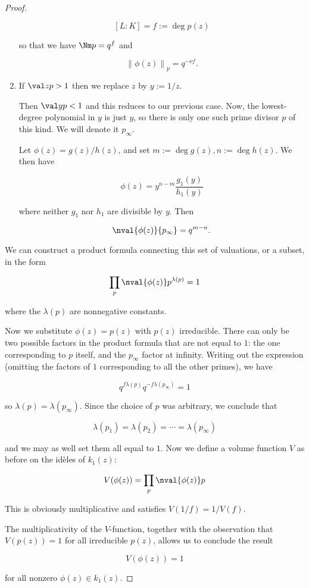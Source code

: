\begin{proof}
\begin{enumerate}
    \[ [L:K] = f := \deg p(z) \]

    so that we have $\Nm p = q^f$ and

    \[ {\left\lVert \phi(z) \right\rVert}_p = q^{-\nu f}. \]

  \item If $\val z p > 1$ then we replace $z$ by $y := 1/z$.

    Then $\val y p < 1$
    and this reduces to our previous case. Now, the lowest-degree polynomial in
    $y$ is just $y$, so there is only one such prime divisor $p$ of this kind.
    We will denote it $p_\infty$.

    Let $\phi(z) = g(z)/h(z)$, and set $m := \deg g(z), n := \deg h(z)$. We then
    have

    \[ \phi(z) = y^{n-m} \frac {g_1(y)} {h_1(y)} \]

    where neither $g_1$ nor $h_1$ are divisible by $y$. Then

    \[ \nval {\phi(z)} {p_\infty} = q^{m - n}. \]
  \end{enumerate}

  We can construct a product formula connecting this set of valuations, or a
  subset, in the form

  \[ \prod_p \nval {\phi(z)} p^{\lambda(p)} = 1 \]

  where the $\lambda(p)$ are nonnegative constants.

  Now we substitute $\phi(z) = p(z)$ with $p(z)$ irreducible. There can only be
  two possible factors in the product formula that are not equal to $1$: the one
  corresponding to $p$ itself, and the $p_\infty$ factor at infinity. Writing
  out the expression (omitting the factors of $1$ corresponding to all the other
  primes), we have

  \[ q^{f\lambda(p)} q^{-f\lambda(p_\infty)} = 1 \]

  so $\lambda(p) = \lambda(p_\infty)$. Since the choice of $p$ was arbitrary, we
  conclude that

  \[ \lambda(p_1) = \lambda(p_2) = \cdots = \lambda(p_\infty) \]

  and we may as well set them all equal to $1$. Now we define a volume function
  $V$ as before on the id\`eles of $k_1(z)$:

  \[ V(\phi(z)) = \prod_p \nval {\phi(z)} p \]

  This is obviously multiplicative and satisfies $V(1/f) = 1/V(f)$.

  The multiplicativity of the $V$-function, together with the observation that
  $V(p(z)) = 1$ for all irreducible $p(z)$, allows us to conclude the result

  \[ V(\phi(z)) = 1 \]

  for all nonzero $\phi(z)\in k_1(z)$.

\end{proof}

